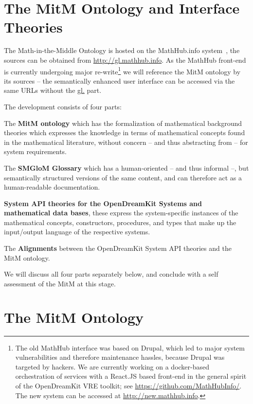 \documentclass{deliverablereport}
\begin{document}
\section{The MitM Ontology and Interface Theories}

The Math-in-the-Middle Ontology is hosted on the MathHub.info system~\cite{IanJucKoh:sdm14,MathHub:on}, the sources can be obtained from \url{http://gl.mathhub.info}.
As the MathHub front-end is currently undergoing major re-write\footnote{The old MathHub interface was based on Drupal, which led to major system vulnerabilities and therefore maintenance hassles, because Drupal was targeted by hackers.
  We are currently working on a docker-based orchestration of services with a React.JS based front-end in the general spirit of the OpenDreamKit VRE toolkit; see \url{https://github.com/MathHubInfo/}.
  The new system can be accessed at \url{http://new.mathhub.info}.} we will reference the MitM ontology by its sources -- the semantically enhanced user interface can be accessed via the same URLs without the \url{gl.} part.

The development consists of four parts:
\begin{compactenum}[\em i\rm)]
\item The \textbf{MitM ontology} which has the formalization of mathematical background theories
  which expresses the knowledge in terms of mathematical concepts found in the
  mathematical literature, without concern -- and thus abstracting from -- for system
  requirements.
\item The \textbf{SMGloM Glossary} which has a human-oriented -- and thus informal --, but
  semantically structured versions of the same content, and can therefore act as a
  human-readable documentation.
\item \textbf{System API theories for the OpenDreamKit Systems and mathematical data bases}, these
  express the system-specific instances of the mathematical concepts, constructors,
  procedures, and types that make up the input/output language of the respective systems.
\item The \textbf{Alignments} between the OpenDreamKit System API theories and the MitM ontology. 
\end{compactenum}
We will discuss all four parts separately below, and conclude with a self assessment of the MitM at this stage.

\section{The MitM Ontology}\label{sec:mitmonto}

\end{document}
